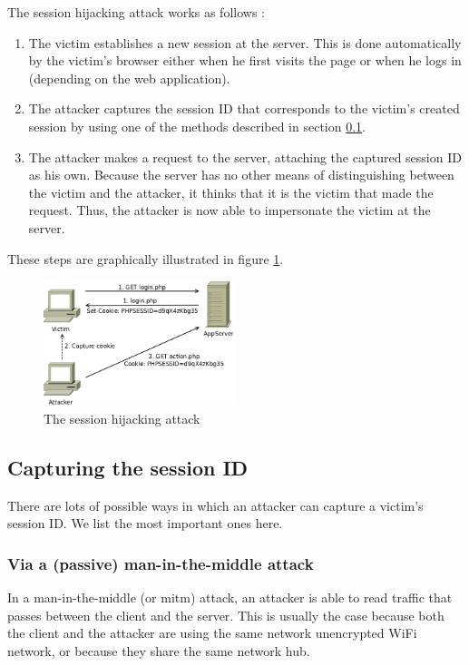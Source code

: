 The session hijacking attack works as follows \cite{Nikiforakis2010}:

\begin{enumerate}
	\item The victim establishes a new session at the server. This is done automatically by the victim's browser either when he first visits the page or when he logs in (depending on the web application).
	\item The attacker captures the session ID that corresponds to the victim's created session by using one of the methods described in section \ref{capturing}.
	\item The attacker makes a request to the server, attaching the captured session ID as his own. Because the server has no other means of distinguishing between the victim and the attacker, it thinks that it is the victim that made the request. Thus, the attacker is now able to impersonate the victim at the server.
\end{enumerate}

These steps are graphically illustrated in figure \ref{fig:hijacking}.

\begin{figure}[ht]
	\centering
	\includegraphics[width=0.50\textwidth]{img/hijacking.png}
	\caption{The session hijacking attack}
	\label{fig:hijacking}
\end{figure}

\subsection{Capturing the session ID}\label{capturing}

There are lots of possible ways in which an attacker can capture a victim's session ID. We list the most important ones here.

\subsubsection{Via a (passive) man-in-the-middle attack}

In a man-in-the-middle (or \gls{mitm}) attack, an attacker is able to read traffic that passes between the client and the server. This is usually the case because both the client and the attacker are using the same network unencrypted WiFi network, or because they share the same network hub.

